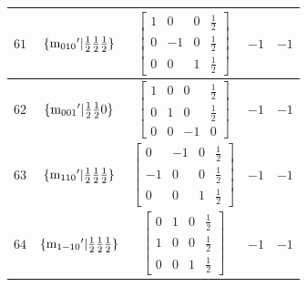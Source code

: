 \documentclass[fleqn,8pt]{jsarticle}
\begin{document}
\begin{longtable}{ccccc}
$ 61 $ & $ \{{\rm m}_{010}{}'|\frac{1}{2} \frac{1}{2} \frac{1}{2}\} $ & $ \begin{bmatrix} 1 & 0 & 0 & \frac{1}{2} \\ 0 & -1 & 0 & \frac{1}{2} \\ 0 & 0 & 1 & \frac{1}{2} \end{bmatrix} $ & $ -1 $ & $ -1 $ \\ \hline
$ 62 $ & $ \{{\rm m}_{001}{}'|\frac{1}{2} \frac{1}{2} 0\} $ & $ \begin{bmatrix} 1 & 0 & 0 & \frac{1}{2} \\ 0 & 1 & 0 & \frac{1}{2} \\ 0 & 0 & -1 & 0 \end{bmatrix} $ & $ -1 $ & $ -1 $ \\ \hline
$ 63 $ & $ \{{\rm m}_{110}{}'|\frac{1}{2} \frac{1}{2} \frac{1}{2}\} $ & $ \begin{bmatrix} 0 & -1 & 0 & \frac{1}{2} \\ -1 & 0 & 0 & \frac{1}{2} \\ 0 & 0 & 1 & \frac{1}{2} \end{bmatrix} $ & $ -1 $ & $ -1 $ \\ \hline
$ 64 $ & $ \{{\rm m}_{1-10}{}'|\frac{1}{2} \frac{1}{2} \frac{1}{2}\} $ & $ \begin{bmatrix} 0 & 1 & 0 & \frac{1}{2} \\ 1 & 0 & 0 & \frac{1}{2} \\ 0 & 0 & 1 & \frac{1}{2} \end{bmatrix} $ & $ -1 $ & $ -1 $ \\
\end{longtable}
\end{document}
